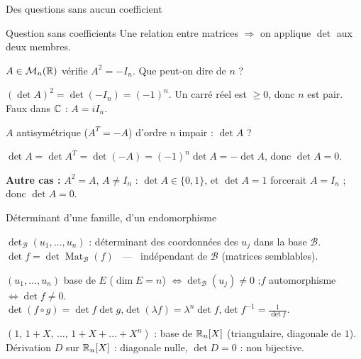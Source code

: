 \documentclass[aspectratio=169,11pt]{beamer}
\newcommand{\Mn}[1]{\mathcal{M}_{n}(#1)}\newcommand{\rg}{\operatorname{rg}}\newcommand{\vect}{\operatorname{Vect}}
\newcommand{\Mat}{\operatorname{Mat}}\newcommand{\Id}{\operatorname{Id}}\newcommand{\com}{\operatorname{com}}
\newcommand{\rep}[1]{\textcolor{Vert}{#1}}%
\begin{document}
\begin{frame}{Des questions sans aucun coefficient}
\begin{METH}{Question sans coefficients}
Une relation entre matrices $\Rightarrow$ on applique $\det$ aux deux membres.
\end{METH}
\begin{ATOI}
$A\in\Mn{\R}$ vérifie $A^2=-I_n$. Que peut-on dire de $n$ ?
\end{ATOI}
\pause
$(\det A)^2=\det(-I_n)=(-1)^n$. Un carré réel est $\geq0$, donc \rep{$n$ est pair}.\quad
\alert{Faux dans $\mathbb{C}$} : $A=iI_n$.
\pause
\begin{ATOI}
$A$ antisymétrique ($A^T=-A$) d'ordre $n$ impair : $\det A$ ?
\end{ATOI}
\pause
$\det A=\det A^T=\det(-A)=(-1)^n\det A=-\det A$, donc \rep{$\det A=0$}.
\pause\par
\textbf{Autre cas :} $A^2=A$, $A\neq I_n$ : $\det A\in\{0,1\}$, et $\det A=1$ forcerait $A=I_n$ ; donc $\det A=0$.
\end{frame}

\begin{frame}{Déterminant d'une famille, d'un endomorphisme}
\begin{DEF}
$\det_{\mathcal B}(u_1,\dots,u_n)$ : déterminant des coordonnées des $u_j$ dans la base $\mathcal B$.\\
$\det f=\det\Mat_{\mathcal B}(f)$ \ --- \ indépendant de $\mathcal B$ (matrices semblables).
\end{DEF}
\begin{PROP}
$(u_1,\dots,u_n)$ base de $E$ ($\dim E=n$) $\iff\det_{\mathcal B}(u_j)\neq0$ ;\quad $f$ automorphisme $\iff\det f\neq0$.\\
$\det(f\circ g)=\det f\det g$,\quad $\det(\lambda f)=\lambda^n\det f$,\quad $\det f^{-1}=\frac1{\det f}$.
\end{PROP}
\pause
\begin{EX}
$(1,\,1+X,\,\dots,\,1+X+\dots+X^n)$ : base de $\mathbb{R}_n[X]$ (triangulaire, diagonale de $1$).\\
Dérivation $D$ sur $\mathbb{R}_n[X]$ : diagonale nulle, $\det D=0$ : non bijective.
\end{EX}
\end{frame}
\end{document}
